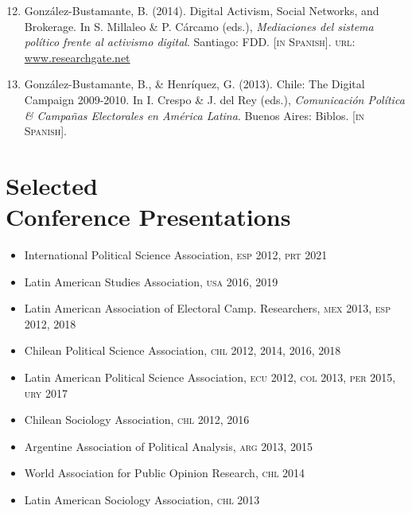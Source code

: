 \documentclass[letterpaper,margin]{res}
\newenvironment{benumerate}[1]{
    \let\oldItem\item
    \def\item{\addtocounter{enumi}{-2}\oldItem}
    \begin{enumerate}
    \setcounter{enumi}{#1}
    \addtocounter{enumi}{1}
}{
    \end{enumerate}
}
\begin{document}
\begin{resume}
\begin{benumerate}{11}
\item{\small Gonz\'alez-Bustamante, B. (2014). Digital Activism, Social Networks, and Brokerage. In S. Millaleo \& P. C\'arcamo (eds.), {\itshape Mediaciones del sistema pol\'itico frente al activismo digital}. Santiago: FDD. {\footnotesize \scshape [in Spanish]}. {\scshape url}: \href{https://www.researchgate.net/publication/321992867_Activismo_digital_redes_sociales_e_intermediacion}{www.researchgate.net}}\vspace{1mm}


\item{\small Gonz\'alez-Bustamante, B., \& Henr\'iquez, G. (2013). Chile: The Digital Campaign 2009-2010. In I. Crespo \& J. del Rey (eds.), {\itshape Comunicaci\'on Pol\'itica \& Campa\~nas Electorales en Am\'erica Latina}. Buenos Aires: Biblos. {\footnotesize \scshape [in Spanish].}}
\end{benumerate}


\section{\footnotesize Selected \\ Conference Presentations}

\begin{itemize}
\item{\small International Political Science Association, {\scshape esp} 2012, {\scshape prt} 2021}
\item{\small Latin American Studies Association, {\scshape usa} 2016, 2019}
\item{\small Latin American Association of Electoral Camp. Researchers, {\scshape mex} 2013, {\scshape esp} 2012, 2018}
\item{\small Chilean Political Science Association, {\scshape chl} 2012, 2014, 2016, 2018}
\item{\small Latin American Political Science Association, {\scshape ecu} 2012, {\scshape col} 2013, {\scshape per} 2015, {\scshape ury} 2017}
\item{\small Chilean Sociology Association, {\scshape chl} 2012, 2016}
\item{\small Argentine Association of Political Analysis, {\scshape arg} 2013, 2015}
\item{\small World Association for Public Opinion Research, {\scshape chl} 2014}
\item{\small Latin American Sociology Association, {\scshape chl} 2013}
\end{itemize}


\end{resume}
\end{document}
